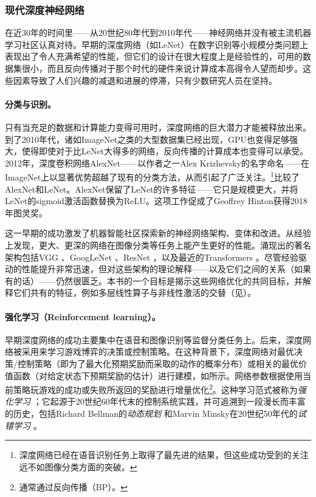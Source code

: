 \documentclass[../../book-main_zh.tex]{subfiles}
\begin{document}
\subsubsection{现代深度神经网络}
在近30年的时间里——从20世纪80年代到2010年代——神经网络并没有被主流机器学习社区认真对待。早期的深度网络（如LeNet）在数字识别等小规模分类问题上表现出了令人充满希望的性能，但它们的设计在很大程度上是经验性的，可用的数据集很小，而且反向传播对于那个时代的硬件来说计算成本高得令人望而却步。这些因素导致了人们兴趣的减退和进展的停滞，只有少数研究人员在坚持。

\paragraph{分类与识别。}
只有当充足的数据和计算能力变得可用时，深度网络的巨大潜力才能被释放出来。到了2010年代，诸如ImageNet之类的大型数据集已经出现，GPU也变得足够强大，使得即使对于比LeNet大得多的网络，反向传播的计算成本也变得可以承受。2012年，深度卷积网络AlexNet——以作者之一Alex
Krizhevsky的名字命名\cite{krizhevsky2012imagenet}——在ImageNet上以显著优势超越了现有的分类方法，从而引起了广泛关注。\footnote{深度网络已经在语音识别任务上取得了最先进的结果，但这些成功受到的关注远不如图像分类方面的突破。}比较了AlexNet和LeNet。AlexNet保留了LeNet的许多特征——它只是规模更大，并将LeNet的sigmoid激活函数替换为ReLU。这项工作促成了Geoffrey
Hinton获得2018年图灵奖。

这一早期的成功激发了机器智能社区探索新的神经网络架构、变体和改进。从经验上发现，更大、更深的网络在图像分类等任务上能产生更好的性能。涌现出的著名架构包括VGG
\cite{Simonyan15}、GoogLeNet \cite{Szegedy2014GoingDW}、ResNet
\cite{He2016-lc}，以及最近的Transformers
\cite{vaswani2017attention}。尽管经验驱动的性能提升非常迅速，但对这些架构的理论解释——以及它们之间的关系（如果有的话）——仍然很匮乏。本书的一个目标是揭示这些网络优化的共同目标，并解释它们共有的特征，例如多层线性算子与非线性激活的交替（见）。

\paragraph{强化学习（Reinforcement learning）。}
早期深度网络的成功主要集中在语音和图像识别等监督分类任务上。后来，深度网络被采用来学习游戏博弈的决策或控制策略。在这种背景下，深度网络对最优决策/控制策略（即为了最大化预期奖励而采取的动作的概率分布）或相关的最优价值函数（对给定状态下预期奖励的估计）进行建模，如所示。网络参数根据使用当前策略玩游戏的成功或失败所返回的奖励进行增量优化\footnote{通常通过反向传播（BP）。}。这种学习范式被称为\textit{强化学习}
\cite{Sutton-Barto}；它起源于20世纪60年代末的控制系统实践\cite{Waltz1965AHA,Mendel1970ReinforcementlearningCA}，并可追溯到一段漫长而丰富的历史，包括Richard
Bellman的\textit{动态规划} \cite{Bellman-DP}和Marvin
Minsky在20世纪50年代的\textit{试错学习} \cite{Minsky-1954}。
\end{document}
